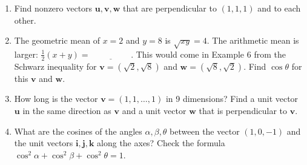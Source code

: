 \documentclass[14pt, a4paper]{article}
\begin{document}
\begin{enumerate}
    \item Find nonzero vectors $\boldsymbol{u}, \boldsymbol{v}, \boldsymbol{w}$ that are perpendicular to $(1,1,1)$ and to each other.

    \item The geometric mean of $x = 2$ and $y = 8$ is $\sqrt{xy} = 4$. The arithmetic mean is larger: $\frac{1}{2}(x + y) = \underline{\hspace{2cm}}$. This would come in Example 6 from the Schwarz inequality for $\boldsymbol{v} = (\sqrt{2}, \sqrt{8})$ and $\boldsymbol{w} = (\sqrt{8}, \sqrt{2})$. Find $\cos\theta$ for this $\boldsymbol{v}$ and $\boldsymbol{w}$.

    \item How long is the vector $\boldsymbol{v} = (1,1,\dots,1)$ in 9 dimensions? Find a unit vector $\boldsymbol{u}$ in the same direction as $\boldsymbol{v}$ and a unit vector $\boldsymbol{w}$ that is perpendicular to $\boldsymbol{v}$.

    \item What are the cosines of the angles $\alpha, \beta, \theta$ between the vector $(1,0,-1)$ and the unit vectors $\boldsymbol{i}, \boldsymbol{j}, \boldsymbol{k}$ along the axes? Check the formula $\cos^2\alpha + \cos^2\beta + \cos^2\theta = 1$.
\end{enumerate}
\end{document}

